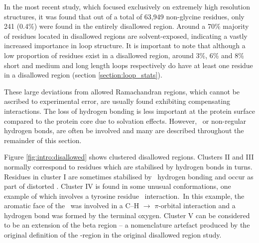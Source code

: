 In the most recent study, which focused exclusively on extremely high resolution
structures, it was found that out of a total of 63,949 non-glycine residues, only 241 (0.4\%) were found in the entirely disallowed region. Around a 70\% majority of residues located in disallowed regions are solvent-exposed, indicating
a vastly increased importance in loop structure\cite{NATIVE:DISALLOWED}. It is important to note that although a low proportion of residues exist in a disallowed region, around 3\%, 6\%
and 8\% short and medium and long length loops respectively do have at least one residue in a disallowed region (section \ref{section:loop_stats}). 

These large deviations from allowed Ramachandran regions, which cannot be ascribed to experimental error, are usually found exhibiting compensating interactions. The loss of hydrogen bonding is less important at the protein surface compared to the protein core due to solvation effects.
However, \sidechain\ or non-regular hydrogen bonds, are often be involved and many are described throughout the remainder of this section. 

Figure \ref{fig:intro:disallowed} shows clustered disallowed  regions. Clusters II and III normally correspond to residues which are stabilised by hydrogen bonds in turns. Residues in cluster I are sometimes stabilised by \sidechain\ hydrogen bonding and occur as part of distorted \bstrands. Cluster IV is found in some unusual conformations, one example of which involves a tyrosine residue \sidechain\ interaction.\ In this example, the aromatic face of the \sidechain\ was involved in a C--H $\to$ $\pi$-orbital interaction and a hydrogen bond was formed by the terminal oxygen\cite{NATIVE:Sam2000}. Cluster V can be considered to be an extension of the beta region -- a nomenclature artefact produced by the original definition of the \be-region in the original disallowed region study\cite{NATIVE:Gunasekaran1996}.
 
